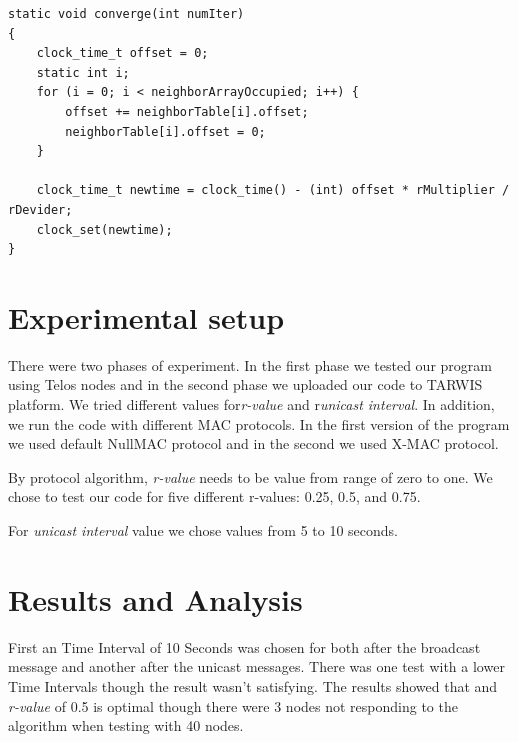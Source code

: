 \documentclass{llncs}
\begin{document}
\begin{lstlisting}
static void converge(int numIter)
{
	clock_time_t offset = 0;
	static int i;
	for (i = 0; i < neighborArrayOccupied; i++) {
		offset += neighborTable[i].offset;
		neighborTable[i].offset = 0;
	}

	clock_time_t newtime = clock_time() - (int) offset * rMultiplier / rDevider;
	clock_set(newtime);
}

\end{lstlisting}

\section{Experimental setup}
There were two phases of experiment. In the first phase we tested our program using Telos nodes and in the second phase we uploaded our code to TARWIS platform. We tried different values for\textit{r-value} and r\textit{unicast interval}. In addition, we run the code with different MAC protocols. In the first version of the program we used default NullMAC protocol and in the second we used X-MAC protocol. 

By protocol algorithm, \textit{r-value} needs to be value from range of zero to one. We chose to test our code for five different r-values: 0.25, 0.5, and 0.75. 

For \textit{unicast interval} value we chose values from 5 to 10 seconds. 

\section{Results and Analysis}

First an Time Interval of 10 Seconds was chosen for both after the broadcast message and another after the unicast messages. There was one test with a lower Time Intervals though the result wasn't satisfying.
The results showed that and \textit{r-value} of 0.5 is optimal though there were 3 nodes not responding to the algorithm when testing with 40 nodes.
\end{document}
